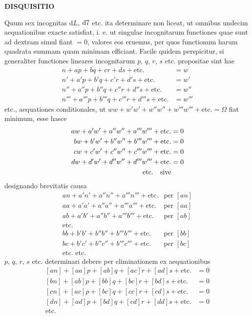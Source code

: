 \par\clearpage
\noindent{}%
%
\parbox[t]{\dimexpr\linewidth-24mm\relax}{\centering\fontsize{7.4}{9.2}\selectfont\bfseries DISQUISITIO\par}%
\makebox[12mm][r]{}\par\nobreak\smallskip
{}
Quum sex incognitas $\mathrm dL$, $\mathrm d\mathord{7}$ etc. ita determinare non liceat, ut omnibus undecim aequationibus exacte satisfiat, i. e. ut singulae incognitarum functiones quae sunt ad dextram simul fiant $=0$, valores eos eruemus, per quos functionum harum quadrata summam quam minimam efficiant. Facile quidem perspicitur, si generaliter functiones lineares incognitarum $p$, $q$, $r$, $s$ etc. propositae sint hae
\[
\begin{aligned}
n+ap+bq+cr+ds+\text{etc.}&=w\\
n'+a'p+b'q+c'r+d's+\text{etc.}&=w'\\
n''+a''p+b''q+c''r+d''s+\text{etc.}&=w''\\
n'''+a'''p+b'''q+c'''r+d'''s+\text{etc.}&=w'''
\end{aligned}
\]
etc., aequationes conditionales, ut $ww+w'w'+w''w''+w'''w'''+\text{etc.}=\Omega$ fiat minimum, esse hasce
\[
\begin{aligned}
aw+a'w'+a''w''+a'''w'''+\text{etc.}&=0\\
bw+b'w'+b''w''+b'''w'''+\text{etc.}&=0\\
cw+c'w'+c''w''+c'''w'''+\text{etc.}&=0\\
dw+d'w'+d''w''+d'''w'''+\text{etc.}&=0\\
\text{etc.\quad sive}&
\end{aligned}
\]
designando brevitatis causa
\[
\begin{array}{ll}
an+a'n'+a''n''+a'''n'''+\text{etc.}&\text{per }[an]\\
aa+a'a'+a''a''+a'''a'''+\text{etc.}&\text{per }[aa]\\
ab+a'b'+a''b''+a'''b'''+\text{etc.}&\text{per }[ab]\\
\text{etc.}&\\
bb+b'b'+b''b''+b'''b'''+\text{etc.}&\text{per }[bb]\\
bc+b'c'+b''c''+b'''c'''+\text{etc.}&\text{per }[bc]\\
\text{etc. etc.}&
\end{array}
\]
$p$, $q$, $r$, $s$ etc. determinari debere per eliminationem ex aequationibus
\[
\begin{aligned}{}
{[an]}+[aa]p+[ab]q+[ac]r+[ad]s+\text{etc.}&=0\\
{[bn]}+[ab]p+[bb]q+[bc]r+[bd]s+\text{etc.}&=0\\
{[cn]}+[ac]p+[bc]q+[cc]r+[cd]s+\text{etc.}&=0\\
{[dn]}+[ad]p+[bd]q+[cd]r+[dd]s+\text{etc.}&=0\\
\text{etc.}&
\end{aligned}
\]
